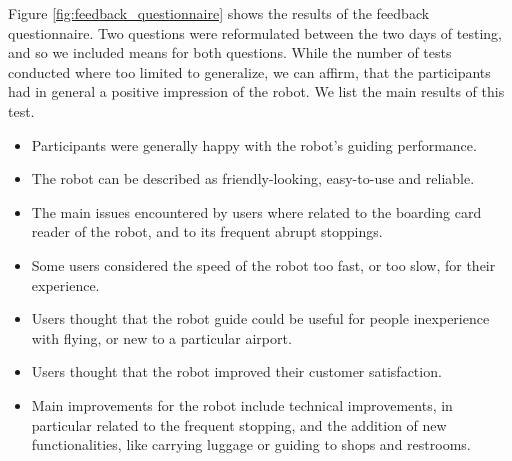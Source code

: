 Figure \ref{fig:feedback_questionnaire} shows the results of the feedback questionnaire. Two questions were reformulated between the two days of testing, and so we included means for both questions. While the number of tests conducted where too limited to generalize, we can affirm, that the participants had in general a positive impression of the robot. We list the main results of this test.

\begin{itemize}
\item Participants were generally happy with the robot's guiding performance.
\item The robot can be described as friendly-looking, easy-to-use and reliable.
\item The main issues encountered by users where related to the boarding card reader of the robot, and to its frequent abrupt stoppings.
\item Some users considered the speed of the robot too fast, or too slow, for their experience.
\item Users thought that the robot guide could be useful for people inexperience with flying, or new to a particular airport.
\item Users thought that the robot improved their customer satisfaction.
\item Main improvements for the robot include technical improvements, in particular related to the frequent stopping, and the addition of new functionalities, like carrying luggage or guiding to shops and restrooms.
\end{itemize}

